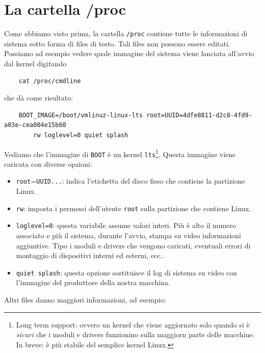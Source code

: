 \documentclass[11pt]{book}
\begin{document}
\section{La cartella /proc}
Come abbiamo visto prima, la cartella \verb*|/proc| contiene tutte le informazioni di sistema sotto forma di files di testo. Tali files non possono essere editati. Possiamo ad esempio vedere quale immagine del sistema viene lanciata all'avvio dal kernel digitando
\begin{verbatim}
	cat /proc/cmdline
\end{verbatim}
che dà come risultato:
\begin{verbatim}
	BOOT_IMAGE=/boot/vmlinuz-linux-lts root=UUID=4dfe8811-d2c8-4fd9-a03e-cea004e15b60 
		rw loglevel=0 quiet splash	
\end{verbatim}
Vediamo che l'immagine di \verb*|BOOT| è un kernel \verb*|lts|\footnote{Long term support: ovvero un kernel che viene aggiornato solo quando si è \textit{sicuri} che i moduli e drivers funzionino sulla maggiorn parte delle macchine. In breve: è più stabile del semplice kernel Linux.}. Questa immagine viene caricata con diverse opzioni:
\begin{itemize}
	\item \verb*|root|=\verb*|UUID...|: indica l'etichetta del disco fisso che contiene la partizione Linux. 
	\item \verb*|rw|: imposta i permessi dell'utente \verb*|root| sulla partizione che contiene Linux.
	\item \verb*|loglevel=0|: questa variabile assume valori interi. Più è alto il numero associato e più il sistema, durante l'avvio, stampa su video informazioni aggiuntive. Tipo i moduli e drivers che vengono caricati, eventuali errori di montaggio di dispositivi interni ed esterni, ecc..
	\item \verb*|quiet splash|: questa opzione sostituisce il log di sistema su video con l'immagine del produttore della nostra macchina.
\end{itemize}
Altri files danno maggiori informazioni, ad esempio:
\end{document}
